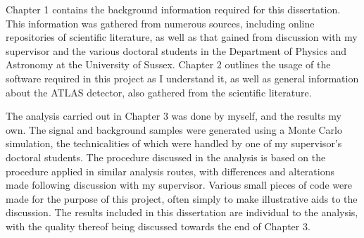 Chapter 1 contains the background information required for this dissertation.
This information was gathered from numerous sources, including online repositories of scientific literature, as well as that gained from discussion with my supervisor and the various doctoral students in the Department of Physics and Astronomy at the University of Sussex.
Chapter 2 outlines the usage of the software required in this project as I understand it, as well as general information about the ATLAS detector, also gathered from the scientific literature.

The analysis carried out in Chapter 3 was done by myself, and the results my own. 
The signal and background samples were generated using a Monte Carlo simulation, the technicalities of which were handled by one of my supervisor's doctoral students.
The procedure discussed in the analysis is based on the procedure applied in similar analysis routes, with differences and alterations made following discussion with my supervisor.
Various small pieces of code were made for the purpose of this project, often simply to make illustrative aids to the discussion. 
The results included in this dissertation are individual to the analysis, with the quality thereof being discussed towards the end of Chapter 3.